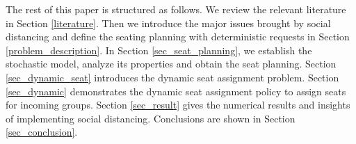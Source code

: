 The rest of this paper is structured as follows. We review the relevant literature in Section \ref{literature}. Then we introduce the major issues brought by social distancing and define the seating planning with deterministic requests in Section \ref{problem_description}. In Section \ref{sec_seat_planning}, we establish the stochastic model, analyze its properties and obtain the seat planning. Section \ref{sec_dynamic_seat} introduces the dynamic seat assignment problem. Section \ref{sec_dynamic} demonstrates the dynamic seat assignment policy to assign seats for incoming groups. Section \ref{sec_result} gives the numerical results and insights of implementing social distancing. Conclusions are shown in Section \ref{sec_conclusion}.
\newpage
